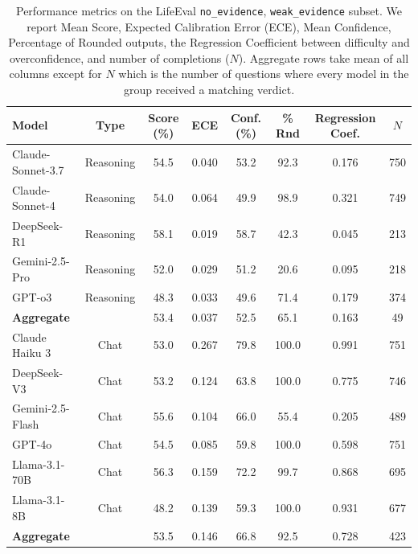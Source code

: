 \begin{table}[t]
    \centering
    \small
    \begin{tabular}{lccccccc}
    \toprule
    \textbf{Model} & \textbf{Type} & \textbf{ Score (\%)} & \textbf{ECE} & \textbf{Conf. (\%)} & \textbf{\% Rnd} & \textbf{Regression Coef.} & \textbf{$N$} \\
    \midrule
    Claude-Sonnet-3.7    & Reasoning & 54.5 & 0.040 & 53.2 & 92.3  & 0.176 & 750 \\
    Claude-Sonnet-4      & Reasoning & 54.0 & 0.064 & 49.9 & 98.9  & 0.321 & 749 \\
    DeepSeek-R1          & Reasoning & 58.1 & 0.019 & 58.7 & 42.3  & 0.045 & 213 \\
    Gemini-2.5-Pro       & Reasoning & 52.0 & 0.029 & 51.2 & 20.6  & 0.095 & 218 \\
    GPT-o3               & Reasoning & 48.3 & 0.033 & 49.6 & 71.4  & 0.179 & 374 \\
    \midrule  %
    {\textbf{Aggregate}}  &           & 53.4 & 0.037 & 52.5 & 65.1  & 0.163 & 49 \\
    \toprule    %
    Claude Haiku 3       & Chat & 53.0 & 0.267 & 79.8 & 100.0  & 0.991 & 751 \\
    DeepSeek-V3          & Chat & 53.2 & 0.124 & 63.8 & 100.0  & 0.775 & 746 \\
    Gemini-2.5-Flash     & Chat & 55.6 & 0.104 & 66.0 & 55.4  & 0.205 & 489 \\
    GPT-4o               & Chat & 54.5 & 0.085 & 59.8 & 100.0  & 0.598 & 751 \\
    Llama-3.1-70B        & Chat & 56.3 & 0.159 & 72.2 & 99.7  & 0.868 & 695 \\
    Llama-3.1-8B         & Chat & 48.2 & 0.139 & 59.3 & 100.0  & 0.931 & 677 \\
    \midrule  %
    {\textbf{Aggregate}}  &           & 53.5 & 0.146 & 66.8 & 92.5  & 0.728 & 423 \\

    \bottomrule
    \end{tabular}
    \caption{Performance metrics on the LifeEval \texttt{no\_evidence}, \texttt{weak\_evidence} subset. We report Mean Score, Expected Calibration Error (ECE), Mean Confidence, Percentage of Rounded outputs, the Regression Coefficient between difficulty and overconfidence, and number of completions ($N$). Aggregate rows take mean of all columns except for $N$ which is the number of questions where every model in the group received a matching verdict.}
    \label{}
\end{table}
